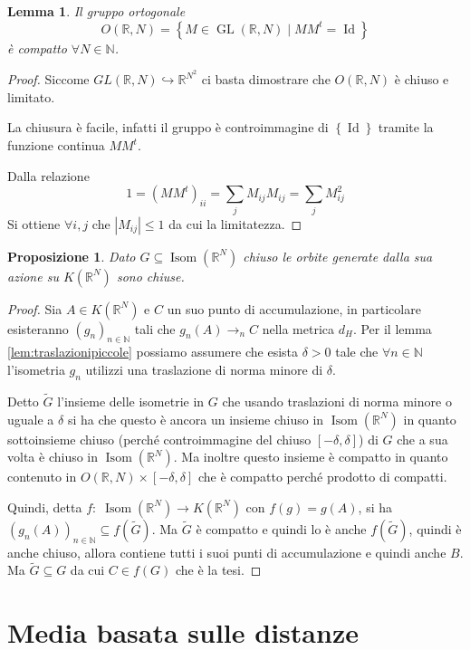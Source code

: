 \documentclass[a4paper,10pt]{article}
\newcounter{counter1}
\theoremstyle{plain}
\newtheorem{mylem}[counter1]{Lemma}
\newtheorem{mypro}[counter1]{Proposizione}
\theoremstyle{definition}
\theoremstyle{remark}
\newcommand{\set}[1]{\left\{#1\right\}}
\newcommand{\pa}[1]{\left(#1\right)}
\newcommand{\bra}[1]{\left[#1\right]}
\newcommand{\abs}[1]{\left|#1\right|}
\DeclareMathOperator{\id}{Id}
\DeclareMathOperator{\gl}{GL}
\DeclareMathOperator{\isom}{Isom}
\begin{document}
\begin{mylem}
  Il gruppo ortogonale 
  \[ O(\mathbb{R},N) = \set{ M \in \gl (\mathbb{R},N) \mid M M^t =
    \id } \]
  è compatto $\forall N \in \mathbb{N}$.
\end{mylem}
\begin{proof}
  Siccome $GL(\mathbb{R},N) \hookrightarrow \mathbb{R}^{N^2}$ ci basta
  dimostrare che $O(\mathbb{R},N)$ è chiuso e limitato.
  
  La chiusura è facile, infatti il gruppo è controimmagine di
  $\set{\id}$ tramite la funzione continua $MM^t$.

  Dalla relazione
  \[ 1 = \pa{MM^t}_{ii} = \sum _j M_{ij} M_{ij} = \sum _j M_{ij} ^2 \] 
  Si ottiene $\forall i,j$ che $\abs{M_{ij}} \le 1$ da cui la
  limitatezza.
\end{proof}

\begin{mypro}
  Dato $G \subseteq \isom(\mathbb{R}^N)$ chiuso le orbite generate
  dalla sua azione su $K(\mathbb{R}^N)$ sono chiuse.
\end{mypro}
\begin{proof}
  Sia $A \in K(\mathbb{R}^N)$ e $C$ un suo punto di accumulazione, in
  particolare esisteranno $\pa{g_n}_{n\in \mathbb{N}}$ tali che
  $g_n(A) \to _n C$ nella metrica $d_H$. Per il lemma
  \ref{lem:traslazionipiccole} possiamo assumere che esista $\delta >
  0$ tale che $\forall n \in \mathbb{N}$ l'isometria $g_n$ utilizzi una
  traslazione di norma minore di $\delta$.

  Detto $\tilde G$ l'insieme delle isometrie in $G$ che usando
  traslazioni di norma minore o uguale a $\delta$ si ha che questo è
  ancora un insieme chiuso in $\isom\pa{\mathbb{R}^N}$ in quanto
  sottoinsieme chiuso (perché controimmagine del chiuso
  $\bra{-\delta,\delta}$) di $G$ che a sua volta è chiuso in
  $\isom(\mathbb{R}^N)$. Ma inoltre questo insieme è compatto in
  quanto contenuto in $O(\mathbb{R},N) \times \bra{-\delta,\delta}$ che
  è compatto perché prodotto di compatti.
  
  Quindi, detta $f:\; \isom(\mathbb{R}^N) \to K(\mathbb{R}^N)$ con
  $f(g) = g(A)$, si ha $\pa{ g_n(A) }_{n \in \mathbb{N}} \subseteq
  f(\tilde G)$. Ma $\tilde G$ è compatto e quindi lo è anche $f(\tilde
  G)$, quindi è anche chiuso, allora contiene tutti i suoi punti di
  accumulazione e quindi anche $B$. Ma $\tilde G \subseteq G$ da cui
  $C \in f(G)$ che è la tesi.
\end{proof}

\section{Media basata sulle distanze}
\end{document}
